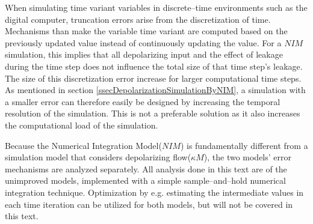         When simulating time variant variables in discrete--time environments such as the digital computer, truncation errors arise from the discretization of time.
		Mechanisms than make the variable time variant are computed based on the previously updated value instead of continuously updating the  value.
		For a $NIM$ simulation, this implies that all depolarizing input and the effect of leakage during the time step does not influence the total size of that time step's leakage.
		The size of this discretization error increase for larger computational time steps.
		As mentioned in section \ref{ssecDepolarizationSimulationByNIM}, a simulation with a smaller error can therefore easily be designed by increasing the temporal resolution of the simulation.
		This is not a preferable solution as it also increases the computational load of the simulation. 


        Because the Numerical Integration Model($NIM$) is fundamentally different from a simulation model that considers depolarizing flow($\kappa M$),
			the two models' error mechanisms are analyzed separately.
%
        All analysis done in this text are of the unimproved models, implemented with a simple sample--and--hold numerical integration technique.
        Optimization by e.g. estimating the intermediate values in each time iteration can be utilized for both models, but will not be covered in this text.



